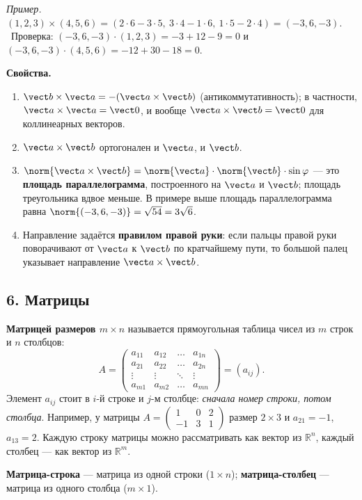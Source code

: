 \textit{Пример.} $(1,2,3)\times(4,5,6)=(2\cdot6-3\cdot5,\ 3\cdot4-1\cdot6,\ 1\cdot5-2\cdot4)=(-3,6,-3)$. \
Проверка: $(-3,6,-3)\cdot(1,2,3)=-3+12-9=0$ и $(-3,6,-3)\cdot(4,5,6)=-12+30-18=0$.

\textbf{Свойства.}
\begin{enumerate}
  \item $\vect b\times\vect a=-(\vect a\times\vect b)$ (антикоммутативность); в частности, $\vect a\times\vect a=\vect 0$, и вообще $\vect a\times\vect b=\vect 0$ для коллинеарных векторов.
  \item $\vect a\times\vect b$ ортогонален и $\vect a$, и $\vect b$.
  \item $\norm{\vect a\times\vect b}=\norm{\vect a}\cdot\norm{\vect b}\cdot\sin\varphi$ --- это \textbf{площадь параллелограмма}, построенного на $\vect a$ и $\vect b$; площадь треугольника вдвое меньше. В примере выше площадь параллелограмма равна $\norm{(-3,6,-3)}=\sqrt{54}=3\sqrt6$.
  \item Направление задаётся \textbf{правилом правой руки}: если пальцы правой руки поворачивают от $\vect a$ к $\vect b$ по кратчайшему пути, то большой палец указывает направление $\vect a\times\vect b$.
\end{enumerate}

\subsection*{6. Матрицы}
\textbf{Матрицей размеров $m\times n$} называется прямоугольная таблица чисел из $m$ строк и $n$ столбцов:
\[
A=\begin{pmatrix}
a_{11}&a_{12}&\dots&a_{1n}\\
a_{21}&a_{22}&\dots&a_{2n}\\
\vdots&\vdots&\ddots&\vdots\\
a_{m1}&a_{m2}&\dots&a_{mn}
\end{pmatrix}=(a_{ij}).
\]
Элемент $a_{ij}$ стоит в $i$-й строке и $j$-м столбце: \emph{сначала номер строки, потом столбца}. Например, у матрицы $A=\left(\begin{smallmatrix}1&0&2\\-1&3&1\end{smallmatrix}\right)$ размер $2\times3$ и $a_{21}=-1$, $a_{13}=2$. Каждую строку матрицы можно рассматривать как вектор из $\mathbb R^n$, каждый столбец --- как вектор из $\mathbb R^m$.

\textbf{Матрица-строка} --- матрица из одной строки ($1\times n$); \textbf{матрица-столбец} --- матрица из одного столбца ($m\times1$).


